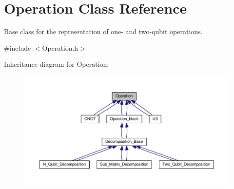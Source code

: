 \hypertarget{class_operation}{}\section{Operation Class Reference}
\label{class_operation}


Base class for the representation of one-\/ and two-\/qubit operations.  




{\ttfamily \#include $<$Operation.\+h$>$}



Inheritance diagram for Operation\+:
\nopagebreak
\begin{figure}[H]
\begin{center}
\leavevmode
\includegraphics[width=350pt]{class_operation__inherit__graph}
\end{center}
\end{figure}
